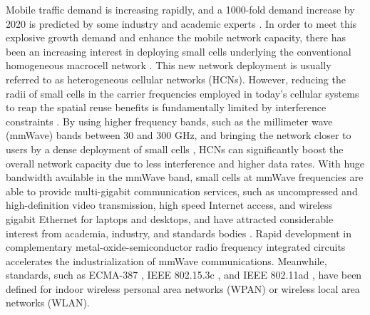 \documentclass[journal]{IEEEtran}
\begin{document}
Mobile traffic demand is increasing rapidly, and a 1000-fold demand increase by 2020 is predicted
by some industry and academic experts \cite{data1, data2}. In order to meet this explosive growth
demand and enhance the mobile network capacity, there has been an increasing interest in deploying
small cells underlying the conventional homogeneous macrocell network \cite{60GHz-backhaul-2}. This
new network deployment is usually referred to as heterogeneous cellular networks (HCNs). However,
reducing the radii of small cells in the carrier frequencies employed in today's cellular systems
to reap the spatial reuse benefits is fundamentally limited by interference constraints
\cite{Pico_60GHz}. By using higher frequency bands, such as the millimeter wave (mmWave) bands
between 30 and 300 GHz, and bringing the network closer to users by a dense deployment of small
cells \cite{Pico_60GHz,dense cells}, HCNs can significantly boost the overall network capacity due
to less interference and higher data rates. With huge bandwidth available in the mmWave band, small cells at mmWave frequencies are able to provide multi-gigabit communication
services, such as uncompressed and high-definition video transmission, high speed Internet access,
and wireless gigabit Ethernet for laptops and desktops, and have attracted considerable interest
from academia, industry, and standards bodies \cite{60GHz-1,60GHz-2}. Rapid development in
complementary metal-oxide-semiconductor radio frequency integrated circuits \cite{CMOS,CMOS2,CMOS3}
accelerates the industrialization of mmWave communications. Meanwhile, standards,
such as ECMA-387 \cite{ECMA 387} , IEEE 802.15.3c \cite{IEEE 802.15.3c}, and IEEE 802.11ad
\cite{IEEE 802.11ad}, have been defined for indoor wireless personal area networks (WPAN) or
wireless local area networks (WLAN).
\end{document}
